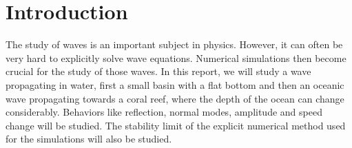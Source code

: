 \section{Introduction}

The study of waves is an important subject in physics. However, it can often be very hard to explicitly solve wave equations. Numerical simulations then become crucial for the study of those waves. In this report, we will study a wave propagating in water, first a small basin with a flat bottom and then an oceanic wave propagating towards a coral reef, where the depth of the ocean can change considerably. Behaviors like reflection, normal modes, amplitude and speed change will be studied. The stability limit of the explicit numerical method used for the simulations will also be studied.
